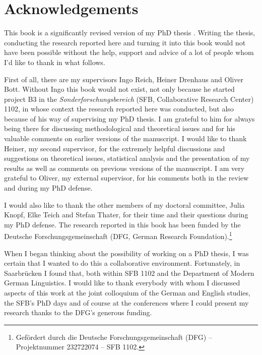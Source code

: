 \chapter{Acknowledgements}
This book is a significantly revised version of my PhD thesis \citep{lemke2020}. Writing the thesis, conducting the research reported here and turning it into this book would not have been possible without the help, support and advice of a lot of people whom I'd like to thank in what follows. 

First of all, there are my supervisors Ingo Reich, Heiner Drenhaus and Oliver Bott. Without Ingo this book would not exist, not only because he started project B3 in the \emph{Sonderforschungsbereich} (SFB, Collaborative Research Center) 1102, in whose context the research reported here was conducted, but also because of his way of supervising my PhD thesis. I am grateful to him for always being there for discussing methodological and theoretical issues and for his valuable comments on earlier versions of the manuscript. I would like to thank Heiner, my second supervisor, for the extremely helpful discussions and suggestions on theoretical issues, statistical analysis and the presentation of my results as well as comments on previous versions of the manuscript. I am very grateful to Oliver, my external supervisor, for his comments both in the review and during my PhD defense. 

I would also like to thank the other members of my doctoral committee, Julia Knopf, Elke Teich and Stefan Thater, for their time and their questions during my PhD defense. The research reported in this book has been funded by the Deutsche Forschungsgemeinschaft (DFG, German Research Foundation).\footnote{Gefördert durch die Deutsche Forschungsgemeinschaft (DFG) – Projektnummer 232722074 – SFB 1102.}

When I began thinking about the possibility of working on a PhD thesis, I was certain that I wanted to do this a collaborative environment. Fortunately, in Saarbrücken I found that, both within SFB 1102 and the Department of Modern German Linguistics. I would like to thank everybody with whom I discussed aspects of this work at the joint colloquium of the German and English studies, the SFB's PhD days and of course at the conferences where I could present my research thanks to the DFG's generous funding. 

